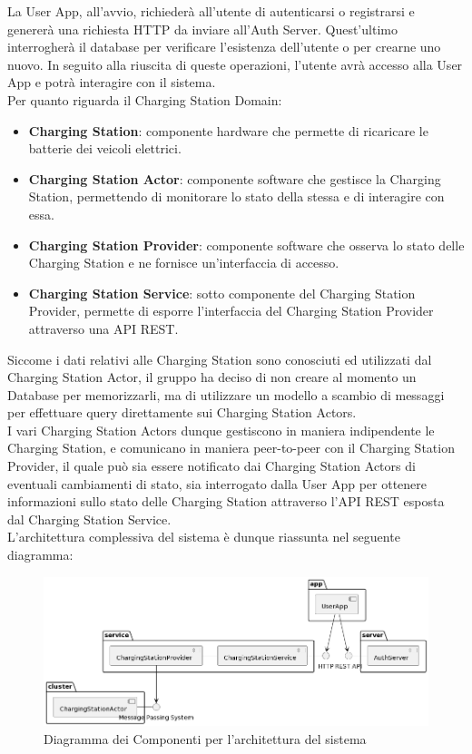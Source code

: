 La User App, all'avvio, richiederà all'utente di autenticarsi o registrarsi e genererà una richiesta HTTP da inviare all'Auth Server. Quest'ultimo interrogherà il database per verificare l'esistenza
dell'utente o per crearne uno nuovo. In seguito alla riuscita di queste operazioni, l'utente avrà accesso alla User App e potrà interagire con il sistema.\\

Per quanto riguarda il Charging Station Domain:
\begin{itemize}
    \item \textbf{Charging Station}: componente hardware che permette di ricaricare le batterie dei veicoli elettrici.
    \item \textbf{Charging Station Actor}: componente software che gestisce la Charging Station, permettendo di monitorare lo stato della stessa e di interagire con essa.
    \item \textbf{Charging Station Provider}: componente software che osserva lo stato delle Charging Station e ne fornisce un'interfaccia di accesso.
    \item \textbf{Charging Station Service}: sotto componente del Charging Station Provider, permette di esporre l'interfaccia del Charging Station Provider attraverso una API REST. \\
\end{itemize}

Siccome i dati relativi alle Charging Station sono conosciuti ed utilizzati dal Charging Station Actor, il gruppo ha deciso di non creare al momento un Database per memorizzarli, ma di utilizzare un modello a scambio di messaggi per effettuare
query direttamente sui Charging Station Actors.\\

I vari Charging Station Actors dunque gestiscono in maniera indipendente le Charging Station, e comunicano in maniera peer-to-peer con il Charging Station Provider, il quale può sia essere notificato
dai Charging Station Actors di eventuali cambiamenti di stato, sia interrogato dalla User App per ottenere informazioni sullo stato delle Charging Station attraverso l'API REST esposta dal Charging Station Service.\\

L'architettura complessiva del sistema è dunque riassunta nel seguente diagramma:

\begin{figure}[htbp]
    \centering
    \includegraphics[width=\textwidth]{images/architecture.png}
    \caption{Diagramma dei Componenti per l'architettura del sistema}
    \label{fig:architecture}
\end{figure}

